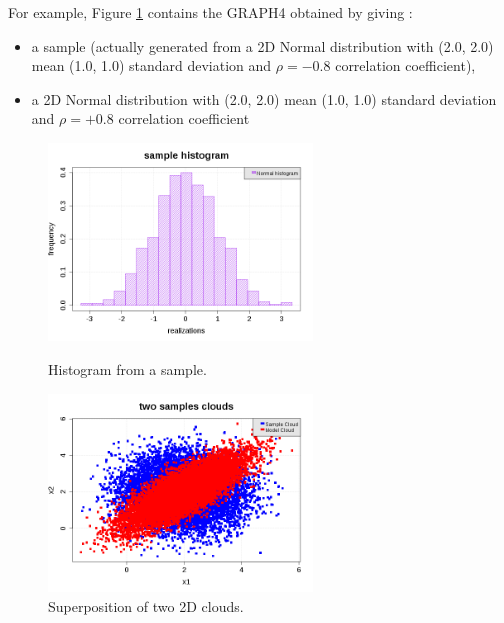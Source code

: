              For example, Figure \ref{superpositionTwoclouds} contains the GRAPH4 obtained by giving :
             \begin{itemize}
             \item a sample (actually generated from a 2D Normal distribution with (2.0, 2.0) mean (1.0, 1.0) standard deviation and $\rho = -0.8$ correlation coefficient),
             \item a 2D Normal distribution with (2.0, 2.0) mean (1.0, 1.0) standard deviation and $\rho = +0.8$ correlation coefficient
             \end{itemize}


             \begin{figure}[H]
               \begin{minipage}{9.8cm}
                 \begin{center}
                   \includegraphics[width=7cm]{Figures/hist_Data.png}
                   \caption{Histogram from a sample.}
                   \label{HistogramData}
                 \end{center}
               \end{minipage}
               \hfill
               \begin{minipage}{9.8cm}
                 \begin{center}
                   \includegraphics[width=7cm]{Figures/cloud1.png}
                   \caption{Superposition of two 2D clouds.}
                   \label{superpositionTwoclouds}
                 \end{center}
               \end{minipage}
             \end{figure}
